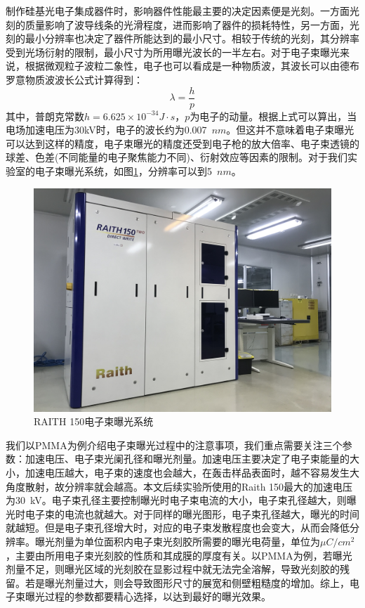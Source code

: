 制作硅基光电子集成器件时，影响器件性能最主要的决定因素便是光刻。一方面光刻的质量影响了波导线条的光滑程度，进而影响了器件的损耗特性，另一方面，光刻的最小分辨率也决定了器件所能达到的最小尺寸。相较于传统的光刻，其分辨率受到光场衍射的限制，最小尺寸为所用曝光波长的一半左右。对于电子束曝光来说，根据微观粒子波粒二象性，电子也可以看成是一种物质波，其波长可以由德布罗意物质波波长公式计算得到：
\begin{equation}
	\lambda = \dfrac{h}{p}	
\end{equation}
其中，普朗克常数$h=6.625\times10^{-34}J\cdot s$，$p$为电子的动量。根据上式可以算出，当电场加速电压为30kV时，电子的波长约为0.007~$nm$。但这并不意味着电子束曝光可以达到这样的精度，电子束曝光的精度还受到电子枪的放大倍率、电子束透镜的球差、色差(不同能量的电子聚焦能力不同)、衍射效应等因素的限制\cite{rai1997handbook}。对于我们实验室的电子束曝光系统，如图\ref{fab_ebl}，分辨率可以到5~$nm$。

\begin{figure}[htb]
	\centering
	\includegraphics[width=12cm]{./Pictures/fab_ebl.jpg}
	\captionsetup{justification=centering}
	\caption{RAITH 150电子束曝光系统}
	\label{fab_ebl}
\end{figure}

我们以PMMA为例介绍电子束曝光过程中的注意事项，我们重点需要关注三个参数：加速电压、电子束光阑孔径和曝光剂量。加速电压主要决定了电子束能量的大小，加速电压越大，电子束的速度也会越大，在轰击样品表面时，越不容易发生大角度散射，故分辨率就会越高。本文后续实验所使用的Raith 150最大的加速电压为30~kV。电子束孔径主要控制曝光时电子束电流的大小，电子束孔径越大，则曝光时电子束的电流也就越大。对于同样的曝光图形，电子束孔径越大，曝光的时间就越短。但是电子束孔径增大时，对应的电子束发散程度也会变大，从而会降低分辨率。曝光剂量为单位面积内电子束光刻胶所需要的曝光电荷量，单位为$\mu C/cm^2$，主要由所用电子束光刻胶的性质和其成膜的厚度有关。以PMMA为例，若曝光剂量不足，则曝光区域的光刻胶在显影过程中就无法完全溶解，导致光刻胶的残留。若是曝光剂量过大，则会导致图形尺寸的展宽和侧壁粗糙度的增加。综上，电子束曝光过程的参数都要精心选择，以达到最好的曝光效果。

